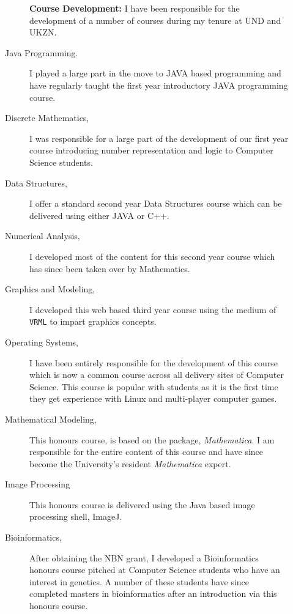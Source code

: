 \begin{description}\item[] \begin{description}\item[] {\large \bf Course Development:} 
 I have been responsible for the development
 of a number of courses during my tenure at UND and UKZN.\newline
\item[Java Programming.] I played a large part in the move to JAVA based programming 
and have regularly taught the first year introductory JAVA programming course.
 \item[Discrete Mathematics,]  I was responsible for a large part of the development of our first year
      course introducing number representation and logic to Computer Science students. 
 \item[Data Structures,]  I offer a standard second year Data Structures course which can be delivered
      using either JAVA or C++.
 \item [Numerical Analysis,] I developed most of the content for this second year
       course which has since been taken over by Mathematics.
 \item[Graphics and Modeling,]  I developed this web based third year course using the 
          medium of {\tt VRML} to impart graphics concepts. 
 \item[Operating Systems,]
      I have been entirely responsible for the development of this course
      which is now a common course across all 
      delivery sites of Computer Science.
      This course is popular with students as it is the first time they
      get experience with Linux and multi-player computer games.
 \item[Mathematical Modeling,]  This honours course,  is based on the
      package, {\em  Mathematica}.
      I am responsible for the entire content of this
      course and have since become
      the University's resident {\em Mathematica} expert.
 \item[Image Processing]  This honours course is delivered using
      the Java based image processing shell, ImageJ. 
 \item[Bioinformatics,]  After obtaining the NBN grant, I developed a 
      Bioinformatics honours course pitched at Computer Science students 
      who have an interest in genetics. 
      A number of these students have since completed masters in
      bioinformatics after an introduction via this honours course.

\end{description}
\end{description}
